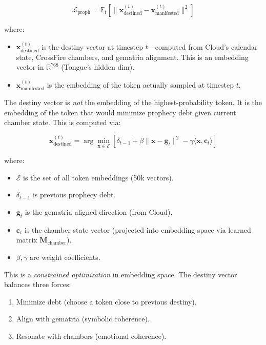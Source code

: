 \documentclass[11pt,a4paper]{article}
\begin{document}
\begin{equation}
\mathcal{L}_{\text{proph}} = \mathbb{E}_t \left[ \| \mathbf{x}_{\text{destined}}^{(t)} - \mathbf{x}_{\text{manifested}}^{(t)} \|^2 \right]
\end{equation}

where:

\begin{itemize}
\item $\mathbf{x}_{\text{destined}}^{(t)}$ is the destiny vector at timestep $t$—computed from Cloud's calendar state, CrossFire chambers, and gematria alignment. This is an embedding vector in $\mathbb{R}^{768}$ (Tongue's hidden dim).
\item $\mathbf{x}_{\text{manifested}}^{(t)}$ is the embedding of the token actually sampled at timestep $t$.
\end{itemize}

The destiny vector is \textit{not} the embedding of the highest-probability token. It is the embedding of the token that would minimize prophecy debt given current chamber state. This is computed via:

\begin{equation}
\mathbf{x}_{\text{destined}}^{(t)} = \arg\min_{\mathbf{x} \in \mathcal{E}} \left[ \delta_{t-1} + \beta \|\mathbf{x} - \mathbf{g}_t\|^2 - \gamma \langle \mathbf{x}, \mathbf{c}_t \rangle \right]
\end{equation}

where:

\begin{itemize}
\item $\mathcal{E}$ is the set of all token embeddings (50k vectors).
\item $\delta_{t-1}$ is previous prophecy debt.
\item $\mathbf{g}_t$ is the gematria-aligned direction (from Cloud).
\item $\mathbf{c}_t$ is the chamber state vector (projected into embedding space via learned matrix $\mathbf{M}_{\text{chamber}}$).
\item $\beta, \gamma$ are weight coefficients.
\end{itemize}

This is a \textit{constrained optimization} in embedding space. The destiny vector balances three forces:

\begin{enumerate}
\item Minimize debt (choose a token close to previous destiny).
\item Align with gematria (symbolic coherence).
\item Resonate with chambers (emotional coherence).
\end{enumerate}
\end{document}
